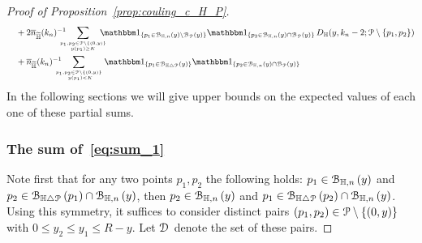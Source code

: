\begin{proof}[Proof of Proposition~\ref{prop:couling_c_H_P}]
\begin{align}
&\hspace{10pt}+ 2 \expH^{-1} \hspace{-10pt} \sum_{p_1,p_2 \in\Pcal \setminus \{(0,y)\} 
	\atop y(p_1) \geq K} \hspace{-10pt} \ind{p_1\in \BallHyp{y}\setminus \BallPo{y}} \ind{p_2\in \BallHyp{y}\cap \BallPo{y}} 
	\, D_\H (y,k_n-2;\Pcal \setminus \{ p_1,p_2\}) \label{eq:sum_5}\\
&\hspace{10pt}+ \expH^{-1} \hspace{-10pt} \sum_{p_1,p_2 \in\Pcal \setminus \{(0,y)\} \atop \ y(p_1) < K}
	\ind{p_1\in \BallSym{y}} \ind{p_2\in \BallHyp{y}\cap \BallPo{y}} \label{eq:sum_6}
\end{align}
In the following sections we will give upper bounds on the expected values of each one of these partial sums. 

\subsubsection*{The sum of~\eqref{eq:sum_1}}
 
Note first that for any two points $p_1,p_2$ the following holds: $p_1 \in {\mathcal B}_{\mathbb{H},n}\left(y\right)$ and $p_2 \in {\mathcal B}_{\mathbb{H} \bigtriangleup {\mathcal P}}\left(p_1\right)\cap {\mathcal B}_{\mathbb{H},n}\left(y\right)$, then $p_2 \in {\mathcal B}_{\mathbb{H},n}\left(y\right)$ and $p_1 \in {\mathcal B}_{\mathbb{H} \bigtriangleup {\mathcal P}}\left(p_2\right)\cap {\mathcal B}_{\mathbb{H},n}\left(y\right)$.
Using this symmetry, it suffices to consider distinct pairs $(p_1,p_2) \in {\mathcal P} \setminus \{(0,y)\}$ with $0\leq y_2 \leq y_1 \leq R- y$. Let $\mathcal{D}_{}$ denote the set of these pairs. 


\end{proof}

